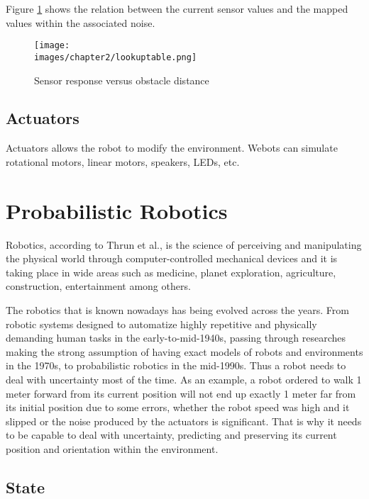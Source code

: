 Figure \ref{fig:ch-2:lookup} shows the relation between the current sensor values and the mapped values within the associated noise.

\begin{figure}[h!]
  \centering
  \texttt{[image: \\images/chapter2/lookuptable.png]}
  \caption{Sensor response versus obstacle distance}
  \label{fig:ch-2:lookup}
\end{figure}

\subsection{Actuators}

Actuators allows the robot to modify the environment. Webots can simulate rotational motors, linear motors, speakers, LEDs, etc. 

\section{Probabilistic Robotics}

Robotics, according to Thrun et al.\cite{Thrun:2005:PR:1121596}, is the science of perceiving and manipulating the physical world through computer-controlled mechanical devices and it is taking place in wide areas such as medicine\cite{Azad:STAR}, planet exploration\cite{Geoffrey:venus}, agriculture\cite{Shamshiri:research-agricultural}, construction\cite{Pileun:construction}, entertainment\cite{Morris:entertainment} among others. 

The robotics that is known nowadays has being evolved across the years. From robotic systems designed to automatize highly repetitive and physically demanding human tasks in the early-to-mid-1940s\cite{Ferreira:prob}, passing through researches making the strong assumption of having exact models of robots and environments in the 1970s, to probabilistic robotics in the mid-1990s\cite{Thrun:robotic-statistics}. Thus a robot needs to deal with uncertainty most of the time. As an example, a robot ordered to walk 1 meter forward from its current position will not end up exactly 1 meter far from its initial position due to some errors, whether the robot speed was high and it slipped or the noise produced by the actuators is significant. That is why it needs to be capable to deal with uncertainty, predicting and preserving its current position and orientation within the environment\cite{Nikos:auxiliary-pf}.

\subsection{State}

